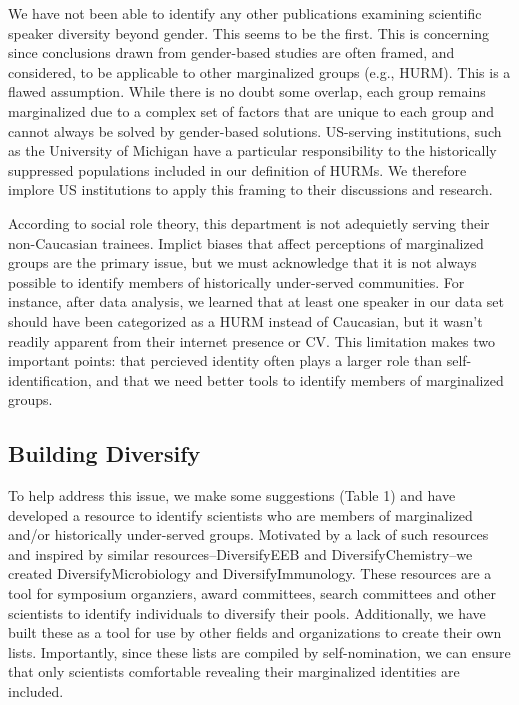\documentclass[10pt,]{article}
\begin{document}
We have not been able to identify any other publications examining
scientific speaker diversity beyond gender. This seems to be the first.
This is concerning since conclusions drawn from gender-based studies are
often framed, and considered, to be applicable to other marginalized
groups (e.g., HURM). This is a flawed assumption. While there is no
doubt some overlap, each group remains marginalized due to a complex set
of factors that are unique to each group and cannot always be solved by
gender-based solutions. US-serving institutions, such as the University
of Michigan have a particular responsibility to the historically
suppressed populations included in our definition of HURMs. We therefore
implore US institutions to apply this framing to their discussions and
research.

According to social role theory, this department is not adequietly
serving their non-Caucasian trainees. Implict biases that affect
perceptions of marginalized groups are the primary issue, but we must
acknowledge that it is not always possible to identify members of
historically under-served communities. For instance, after data
analysis, we learned that at least one speaker in our data set should
have been categorized as a HURM instead of Caucasian, but it wasn't
readily apparent from their internet presence or CV. This limitation
makes two important points: that percieved identity often plays a larger
role than self-identification, and that we need better tools to identify
members of marginalized groups.

\subsection{Building Diversify}\label{building-diversify}

To help address this issue, we make some suggestions (Table 1) and have
developed a resource to identify scientists who are members of
marginalized and/or historically under-served groups. Motivated by a
lack of such resources and inspired by similar resources--DiversifyEEB
and DiversifyChemistry--we created DiversifyMicrobiology and
DiversifyImmunology. These resources are a tool for symposium
organziers, award committees, search committees and other scientists to
identify individuals to diversify their pools. Additionally, we have
built these as a tool for use by other fields and organizations to
create their own lists. Importantly, since these lists are compiled by
self-nomination, we can ensure that only scientists comfortable
revealing their marginalized identities are included.
\end{document}
